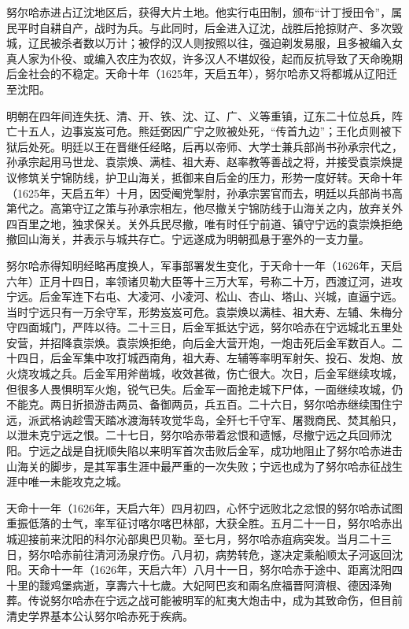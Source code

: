 努尔哈赤进占辽沈地区后，获得大片土地。他实行屯田制，颁布“计丁授田令”，属民平时自耕自产，战时为兵。与此同时，后金进入辽沈，战胜后抢掠财产、多次毁城，辽民被杀者数以万计；被俘的汉人则按照以往，强迫剃发易服，且多被编入女真人家为仆役、或编入农庄为农奴，许多汉人不堪奴役，起而反抗导致了天命晚期后金社会的不稳定。天命十年（1625年，天启五年），努尔哈赤又将都城从辽阳迁至沈阳。

明朝在四年间连失抚、清、开、铁、沈、辽、广、义等重镇，辽东二十位总兵，阵亡十五人，边事岌岌可危。熊廷弼因广宁之败被处死，“传首九边”；王化贞则被下狱后处死。明廷以王在晋继任经略，后再以帝师、大学士兼兵部尚书孙承宗代之，孙承宗起用马世龙、袁崇焕、满桂、祖大寿、赵率教等善战之将，并接受袁崇焕提议修筑关宁锦防线，护卫山海关，抵御来自后金的压力，形势一度好转。天命十年（1625年，天启五年）十月，因受阉党掣肘，孙承宗罢官而去，明廷以兵部尚书高第代之。高第守辽之策与孙承宗相左，他尽撤关宁锦防线于山海关之内，放弃关外四百里之地，独求保关。关外兵民尽撤，唯有时任宁前道、镇守宁远的袁崇焕拒绝撤回山海关，并表示与城共存亡。宁远遂成为明朝孤悬于塞外的一支力量。

努尔哈赤得知明经略再度换人，军事部署发生变化，于天命十一年（1626年，天启六年）正月十四日，率领诸贝勒大臣等十三万大军，号称二十万，西渡辽河，进攻宁远。后金军连下右屯、大凌河、小凌河、松山、杏山、塔山、兴城，直逼宁远。当时宁远只有一万余守军，形势岌岌可危。袁崇焕以满桂、祖大寿、左辅、朱梅分守四面城门，严阵以待。二十三日，后金军抵达宁远，努尔哈赤在宁远城北五里处安营，并招降袁崇焕。袁崇焕拒绝，向后金大营开炮，一炮击死后金军数百人。二十四日，后金军集中攻打城西南角，祖大寿、左辅等率明军射矢、投石、发炮、放火烧攻城之兵。后金军用斧凿城，收效甚微，伤亡很大。次日，后金军继续攻城，但很多人畏惧明军火炮，锐气已失。后金军一面抢走城下尸体，一面继续攻城，仍不能克。两日折损游击两员、备御两员，兵五百。二十六日，努尔哈赤继续围住宁远，派武格讷趁雪天踏冰渡海转攻觉华岛，全歼七千守军、屠戮商民、焚其船只，以泄未克宁远之恨。二十七日，努尔哈赤带着忿恨和遗憾，尽撤宁远之兵回师沈阳。宁远之战是自抚顺失陷以来明军首次击败后金军，成功地阻止了努尔哈赤进击山海关的脚步，是其军事生涯中最严重的一次失败；宁远也成为了努尔哈赤征战生涯中唯一未能攻克之城。

天命十一年（1626年，天启六年）四月初四，心怀宁远败北之忿恨的努尔哈赤试图重振低落的士气，率军征讨喀尔喀巴林部，大获全胜。五月二十一日，努尔哈赤出城迎接前来沈阳的科尔沁部奥巴贝勒。至七月，努尔哈赤疽病突发。当月二十三日，努尔哈赤前往清河汤泉疗伤。八月初，病势转危，遂决定乘船顺太子河返回沈阳。天命十一年（1626年，天启六年）八月十一日，努尔哈赤于途中、距离沈阳四十里的靉鸡堡病逝，享壽六十七歲。大妃阿巴亥和兩名庶福晋阿濟根、德因泽殉葬。传说努尔哈赤在宁远之战可能被明军的紅夷大炮击中，成为其致命伤，但目前清史学界基本公认努尔哈赤死于疾病。

